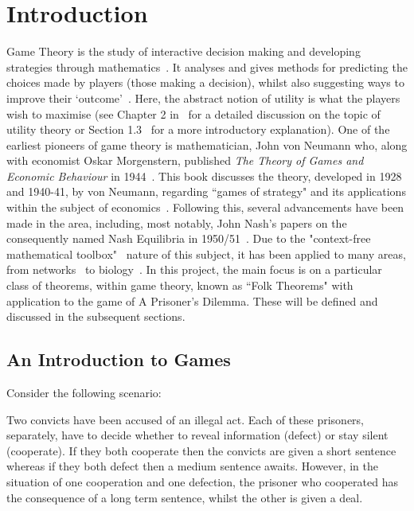 \chapter{Introduction}\label{ch:Introduction}

Game Theory is the study of interactive decision making and developing
strategies through mathematics~\cite{Dictionary2013}. It analyses and gives
methods for predicting the choices made by players (those making a decision),
whilst also suggesting ways to improve their `outcome'~\cite{maschler_solan_zamir_2013}. Here, the abstract notion of utility is what
the players wish to maximise (see Chapter 2 in~\cite{maschler_solan_zamir_2013}
for a detailed discussion on the topic of utility theory or Section 1.3~\cite{Webb2007} for a more introductory explanation). One of the earliest
pioneers of game theory is mathematician, John von Neumann who, along with
economist Oskar Morgenstern, published \textit{The Theory of Games and Economic
Behaviour} in 1944~\cite{maschler_solan_zamir_2013}. This book discusses the
theory, developed in 1928 and 1940-41, by von Neumann, regarding ``games of
strategy" and its applications within the subject of economics~\cite{von2007theory}. Following this, several advancements have been made in the
area, including, most notably, John Nash's papers on the consequently named Nash
Equilibria in 1950/51~\cite{nash1950equilibrium, nash1951non}. Due to the
"context-free mathematical toolbox"~\cite{maschler_solan_zamir_2013} nature of
this subject, it has been applied to many areas, from
networks~\cite{liang2012game, 1593279} to biology~\cite{chen2009robust, adeoye2012application}. In this project, the main focus is on a
particular class of theorems, within game theory, known as ``Folk Theorems" with
application to the game of A Prisoner's Dilemma. These will be defined and
discussed in the subsequent sections.

\section{An Introduction to Games}\label{sec:An_Intro_to_Games}
Consider the following scenario:

\begin{center}
    Two convicts have been accused of an illegal act. Each of these prisoners,
    separately, have to decide whether to reveal information (defect) or stay
    silent (cooperate). If they both cooperate then the convicts are given a
    short sentence whereas if they both defect then a medium sentence awaits.
    However, in the situation of one cooperation and one defection, the prisoner
    who cooperated has the consequence of a long term sentence, whilst the other
    is given a deal.~\cite{Knight2017}
\end{center}

